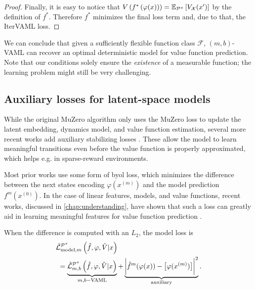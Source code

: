 \begin{proof}
Finally, it is easy to notice that $V\roundb{f^*\roundb{\varphi(x)}} = \EEX{\P^\pi}{V_\mathcal{X}(x')}$ by the definition of $f^*$.
Therefore $f^*$ minimizes the final loss term and, due to that, the IterVAML loss.

\end{proof}



We can conclude that given a sufficiently flexible function class $\mathcal{F}$, $(m,b)$-VAML can recover an optimal deterministic model for value function prediction.
Note that our conditions solely ensure the \emph{existence} of a measurable function; the learning problem might still be very challenging.

\subsection{Auxiliary losses for latent-space models}

While the original MuZero algorithm only uses the MuZero loss to update the latent embedding, dynamics model, and value function estimation, several more recent works add auxiliary stabilizing losses \parencite{ye2021mastering,hafner2021mastering,hansen2024tdmpc,voelcker2025mad}.
These allow the model to learn meaningful transitions even before the value function is properly approximated, which helps e.g. in sparse-reward environments.

Most prior works use some form of \ac{byol} \parencite{grill2020bootstrap} loss, which minimizes the difference between the next states encoding $\varphi(x^{(m)})$ and the model prediction $f^m(x^{(0)})$.
In the case of linear features, models, and value functions, recent works, discussed in \autoref{chap:understanding}, have shown that such a loss can greatly aid in learning meaningful features for value function prediction \parencite{lyle2022understanding,tang2022understanding,ni2024bridging,voelcker2024when}.

When the difference is computed with an $L_2$, the model loss is
\begin{align}
    & \hat{\mathcal{L}}^{\P^\pi}_{\mathrm{model}, m}\left(\hat{f},
\varphi, \hat{V}|x\right) \nonumber\\
    & ~ = \underbrace{\hat{\mathcal{L}}^{\P^\pi}_{m,b}\left(\hat{f},\varphi, \hat{V}|x\right)}_{m,b\mathrm{-VAML}} + \underbrace{\biggl| \hat{f}^m(\varphi(x)) - \bigl[\varphi(x^{(m)}) \bigr] \biggr|^2}_\mathrm{auxiliary}.
\end{align}


